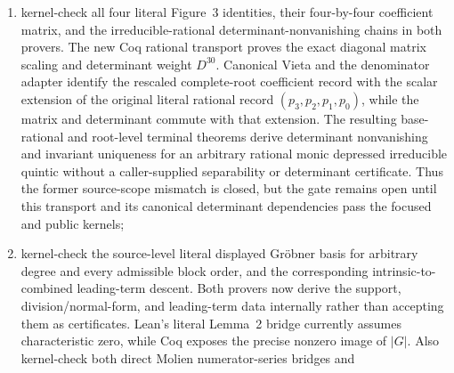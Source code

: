 \documentclass[11pt,a4paper,oneside]{article}
\begin{document}
\begin{enumerate}
  through the public aggregate and keep that task distinct from the
  Dummit-gated polynomial realization.  Then rebuild the conjugacy correction
  to Theorem~1, including both its finite $S_5/F_{20}$ witness and the explicit
  irreducible-rational polynomial realization with exact roots, genuine
  splitting-field Galois action, separable base-root resolvent, corrected
  conjugate containment, and failed displayed containment; rebuild the
  committed, focused-kernel-checked Lean
  exact $C_5/D_5$ stabilizers, arbitrary-polynomial minimum-degree theorems,
  separate literal $S_5/C_5$ and $S_5/D_5$ low-degree collision theorems, and
  irreducible $X^5-2$ instantiations through the public audit, and kernel-check
  their matching Coq modules; rebuild the committed, focused-kernel-checked
  Lean degree-five $T'$, $U'$, $T'U'$, and epsilon two-coset relative-resolvent
  modules through the public audit, and kernel-check the matching Coq
  relative-resolvent and common-field wrappers.  The matching Coq
  classification and bridge remain pending;
\item kernel-check all four literal Figure~3 identities, their four-by-four
  coefficient matrix, and the irreducible-rational determinant-nonvanishing
  chains in both provers.  The new Coq rational transport proves the exact
  diagonal matrix scaling and determinant weight $D^{30}$.  Canonical Vieta
  and the denominator adapter identify the rescaled complete-root
  coefficient record with the scalar extension of the original literal
  rational record $(p_3,p_2,p_1,p_0)$, while the matrix and determinant
  commute with that extension.  The resulting base-rational and root-level
  terminal theorems derive determinant nonvanishing and invariant uniqueness
  for an arbitrary rational monic depressed irreducible quintic without a
  caller-supplied separability or determinant certificate.  Thus the former
  source-scope mismatch is closed, but the gate remains open until this
  transport and its canonical determinant dependencies pass the focused and
  public kernels;
\item kernel-check the source-level literal displayed Gr\"obner basis for
  arbitrary degree and every admissible block order, and the corresponding
  intrinsic-to-combined leading-term descent.  Both provers now derive the
  support, division/normal-form, and leading-term data internally rather than
  accepting them as certificates.  Lean's literal Lemma~2 bridge currently
  assumes characteristic zero, while Coq exposes the precise nonzero image of
  $|G|$.  Also kernel-check both direct Molien numerator-series bridges and

\end{enumerate}
\end{document}

